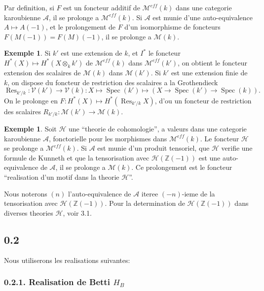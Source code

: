 \documentclass[12pt,a4paper]{article}
\theoremstyle{plain}
\theoremstyle{definition}
\newtheorem{example}[definition]{Exemple}
\theoremstyle{remark}
\DeclareMathOperator{\Spec}{Spec}
\DeclareMathOperator{\Res}{Res}
\newcommand{\Z}{\mathbb{Z}}
\begin{document}
Par definition, si $F$ est un foncteur additif de $\mathcal{M}^{eff}(k)$ dans une categorie karoubienne
$\mathcal{A}$, il se prolonge a $\mathcal{M}^{eff}(k)$. Si $\mathcal{A}$ est munie d'une auto-equivalence $A \mapsto A(-1)$,
et le prolongement de $F$ d'un isomorphisme de foncteurs $F(M(-1)) = F(M)(-1)$,
il se prolonge a $\mathcal{M}(k)$.

\begin{example}
Si $k'$ est une extension de $k$, et $I^*$ le foncteur $H^*(X) \mapsto H^*(X \otimes_k k')$
de $\mathcal{M}^{eff}(k)$ dans $\mathcal{M}^{eff}(k')$, on obtient le foncteur extension des scalaires de
$\mathcal{M}(k)$ dans $\mathcal{M}(k')$. Si $k'$ est une extension finie de $k$, on dispose du foncteur de
restriction des scalaires a la Grothendieck
\[
\Res_{k'/k}: \mathcal{V}(k') \to \mathcal{V}(k): X \mapsto \Spec(k') \mapsto (X \to \Spec(k') \to \Spec(k)).
\]
On le prolonge en $F: H^*(X) \mapsto H^*(\Res_{k'/k} X)$, d'ou un foncteur de restriction
des scalaires $R_{k'/k}: \mathcal{M}(k') \to \mathcal{M}(k)$.
\end{example}

\begin{example}
Soit $\mathcal{H}$ une ``theorie de cohomologie'', a valeurs dans une categorie karoubienne
$\mathcal{A}$, fonctorielle pour les morphismes dans $\mathcal{M}^{eff}(k)$. Le foncteur $\mathcal{H}$ se prolonge
a $\mathcal{M}^{eff}(k)$. Si $\mathcal{A}$ est munie d'un produit tensoriel, que $\mathcal{H}$ verifie une formule de
Kunneth et que la tensorisation avec $\mathcal{H}(\Z(-1))$ est une auto-equivalence de $\mathcal{A}$,
il se prolonge a $\mathcal{M}(k)$. Ce prolongement est le foncteur ``realisation d'un motif
dans la theorie $\mathcal{H}$''.

Nous noterons $(n)$ l'auto-equivalence de $\mathcal{A}$ iteree $(-n)$-ieme de la tensorisation
avec $\mathcal{H}(\Z(-1))$. Pour la determination de $\mathcal{H}(\Z(-1))$ dans diverses theories $\mathcal{H}$,
voir 3.1.
\end{example}

\subsection*{0.2}

Nous utiliserons les realisations suivantes:

\subsubsection*{0.2.1. Realisation de Betti $H_B$}
\end{document}
